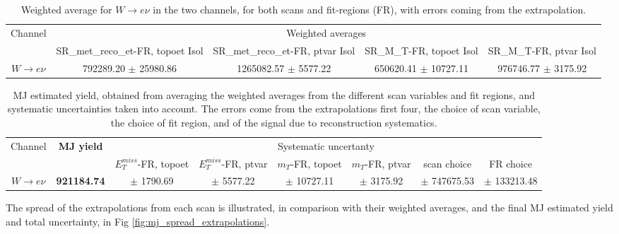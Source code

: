 \begin{table}[htbp]
\scriptsize
\begin{center}
 \begin{tabular}{ | c | c | c | c | c | } 
 \hline
Channel & \multicolumn{4}{|c|}{Weighted averages} \\
  & SR\_met\_reco\_et-FR, topoet Isol & SR\_met\_reco\_et-FR, ptvar Isol & SR\_M\_T-FR, topoet Isol & SR\_M\_T-FR, ptvar Isol \\
\hline
 $W \rightarrow e\nu$  & 792289.20 $\pm$ 25980.86 & 1265082.57 $\pm$ 5577.22 & 650620.41 $\pm$ 10727.11 & 976746.77 $\pm$ 3175.92 \\
  \hline
\end{tabular}
\caption{
Weighted average for $W\rightarrow e\nu$ in the two channels, for both scans and fit-regions (FR), with errors coming from the extrapolation.
}%
\label{tbl:bkg_mj_we_wa_extrapolation}
\end{center}
\end{table}

\begin{table}[htbp]
\scriptsize
\begin{center}
 \begin{tabular}{ | c | c | c | c | c | c | c | c | } 
\hline
Channel & \textbf{MJ yield} & \multicolumn{6}{|c|}{Systematic uncertanty} \\
 &  & $E_T^{miss}$-FR, topoet & $E_T^{miss}$-FR, ptvar & $m_T$-FR, topoet & $m_T$-FR, ptvar & scan choice & FR choice \\
\hline
 $W \rightarrow e\nu$  & \textbf{921184.74} & $\pm$ 1790.69 & $\pm$ 5577.22 & $\pm$ 10727.11 & $\pm$ 3175.92 & $\pm$ 747675.53 & $\pm$ 133213.48 \\
  \hline
\end{tabular}
\caption{
MJ estimated yield, obtained from averaging the weighted averages from the different scan variables and fit regions, and systematic uncertainties taken into account. 
The errors come from the extrapolations first four, the choice of scan variable, the choice of fit region, and  of the signal due to reconstruction systematics.
}%
\label{tbl:bkg_mj_we_wa_total}
\end{center}
\end{table}


The spread of the extrapolations from each scan is illustrated, in comparison with their weighted averages, and the final MJ estimated yield and total uncertainty, in Fig \ref{fig:mj_spread_extrapolations}.

